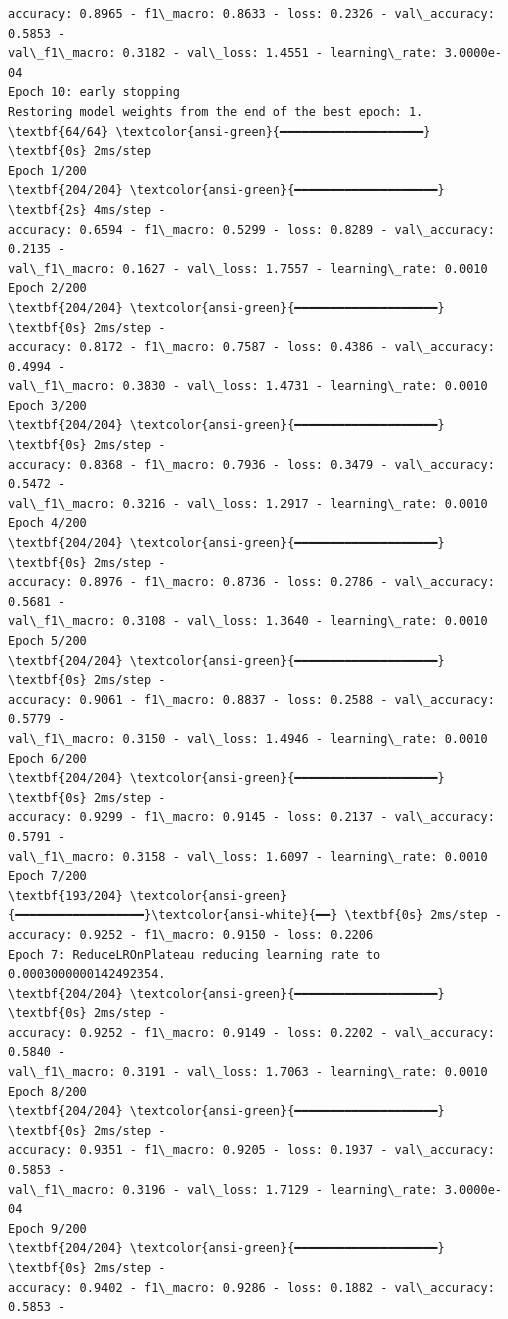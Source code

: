 \documentclass[11pt]{article}
\begin{document}
\begin{Verbatim}[commandchars=\\\{\}]
accuracy: 0.8965 - f1\_macro: 0.8633 - loss: 0.2326 - val\_accuracy: 0.5853 -
val\_f1\_macro: 0.3182 - val\_loss: 1.4551 - learning\_rate: 3.0000e-04
Epoch 10: early stopping
Restoring model weights from the end of the best epoch: 1.
\textbf{64/64} \textcolor{ansi-green}{━━━━━━━━━━━━━━━━━━━━} \textbf{0s} 2ms/step
Epoch 1/200
\textbf{204/204} \textcolor{ansi-green}{━━━━━━━━━━━━━━━━━━━━} \textbf{2s} 4ms/step -
accuracy: 0.6594 - f1\_macro: 0.5299 - loss: 0.8289 - val\_accuracy: 0.2135 -
val\_f1\_macro: 0.1627 - val\_loss: 1.7557 - learning\_rate: 0.0010
Epoch 2/200
\textbf{204/204} \textcolor{ansi-green}{━━━━━━━━━━━━━━━━━━━━} \textbf{0s} 2ms/step -
accuracy: 0.8172 - f1\_macro: 0.7587 - loss: 0.4386 - val\_accuracy: 0.4994 -
val\_f1\_macro: 0.3830 - val\_loss: 1.4731 - learning\_rate: 0.0010
Epoch 3/200
\textbf{204/204} \textcolor{ansi-green}{━━━━━━━━━━━━━━━━━━━━} \textbf{0s} 2ms/step -
accuracy: 0.8368 - f1\_macro: 0.7936 - loss: 0.3479 - val\_accuracy: 0.5472 -
val\_f1\_macro: 0.3216 - val\_loss: 1.2917 - learning\_rate: 0.0010
Epoch 4/200
\textbf{204/204} \textcolor{ansi-green}{━━━━━━━━━━━━━━━━━━━━} \textbf{0s} 2ms/step -
accuracy: 0.8976 - f1\_macro: 0.8736 - loss: 0.2786 - val\_accuracy: 0.5681 -
val\_f1\_macro: 0.3108 - val\_loss: 1.3640 - learning\_rate: 0.0010
Epoch 5/200
\textbf{204/204} \textcolor{ansi-green}{━━━━━━━━━━━━━━━━━━━━} \textbf{0s} 2ms/step -
accuracy: 0.9061 - f1\_macro: 0.8837 - loss: 0.2588 - val\_accuracy: 0.5779 -
val\_f1\_macro: 0.3150 - val\_loss: 1.4946 - learning\_rate: 0.0010
Epoch 6/200
\textbf{204/204} \textcolor{ansi-green}{━━━━━━━━━━━━━━━━━━━━} \textbf{0s} 2ms/step -
accuracy: 0.9299 - f1\_macro: 0.9145 - loss: 0.2137 - val\_accuracy: 0.5791 -
val\_f1\_macro: 0.3158 - val\_loss: 1.6097 - learning\_rate: 0.0010
Epoch 7/200
\textbf{193/204} \textcolor{ansi-green}{━━━━━━━━━━━━━━━━━━}\textcolor{ansi-white}{━━} \textbf{0s} 2ms/step -
accuracy: 0.9252 - f1\_macro: 0.9150 - loss: 0.2206
Epoch 7: ReduceLROnPlateau reducing learning rate to 0.0003000000142492354.
\textbf{204/204} \textcolor{ansi-green}{━━━━━━━━━━━━━━━━━━━━} \textbf{0s} 2ms/step -
accuracy: 0.9252 - f1\_macro: 0.9149 - loss: 0.2202 - val\_accuracy: 0.5840 -
val\_f1\_macro: 0.3191 - val\_loss: 1.7063 - learning\_rate: 0.0010
Epoch 8/200
\textbf{204/204} \textcolor{ansi-green}{━━━━━━━━━━━━━━━━━━━━} \textbf{0s} 2ms/step -
accuracy: 0.9351 - f1\_macro: 0.9205 - loss: 0.1937 - val\_accuracy: 0.5853 -
val\_f1\_macro: 0.3196 - val\_loss: 1.7129 - learning\_rate: 3.0000e-04
Epoch 9/200
\textbf{204/204} \textcolor{ansi-green}{━━━━━━━━━━━━━━━━━━━━} \textbf{0s} 2ms/step -
accuracy: 0.9402 - f1\_macro: 0.9286 - loss: 0.1882 - val\_accuracy: 0.5853 -

\end{Verbatim}
\end{document}
